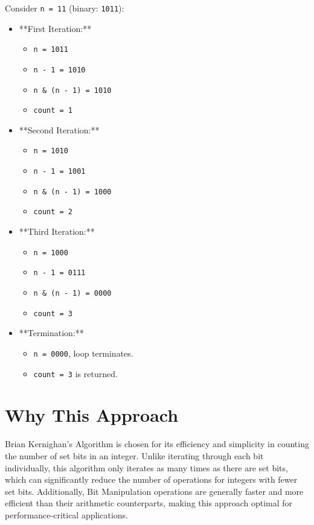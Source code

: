 Consider \texttt{n = 11} (binary: \texttt{1011}):

\begin{itemize}
    \item **First Iteration:**
    \begin{itemize}
        \item \texttt{n = 1011}
        \item \texttt{n - 1 = 1010}
        \item \texttt{n \& (n - 1) = 1010}
        \item \texttt{count = 1}
    \end{itemize}
    
    \item **Second Iteration:**
    \begin{itemize}
        \item \texttt{n = 1010}
        \item \texttt{n - 1 = 1001}
        \item \texttt{n \& (n - 1) = 1000}
        \item \texttt{count = 2}
    \end{itemize}
    
    \item **Third Iteration:**
    \begin{itemize}
        \item \texttt{n = 1000}
        \item \texttt{n - 1 = 0111}
        \item \texttt{n \& (n - 1) = 0000}
        \item \texttt{count = 3}
    \end{itemize}
    
    \item **Termination:**
    \begin{itemize}
        \item \texttt{n = 0000}, loop terminates.
        \item \texttt{count = 3} is returned.
    \end{itemize}
\end{itemize}

\section*{Why This Approach}

Brian Kernighan’s Algorithm is chosen for its efficiency and simplicity in counting the number of set bits in an integer. Unlike iterating through each bit individually, this algorithm only iterates as many times as there are set bits, which can significantly reduce the number of operations for integers with fewer set bits. Additionally, Bit Manipulation operations are generally faster and more efficient than their arithmetic counterparts, making this approach optimal for performance-critical applications.

